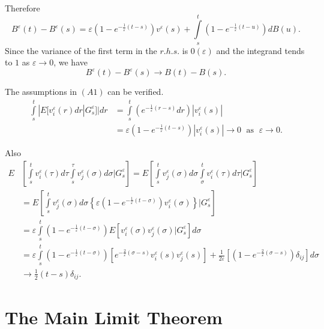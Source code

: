 Therefore\pageoriginale
$$
B^\varepsilon(t) - B^\varepsilon (s) = \varepsilon(1-e^{-
  \frac{1}{\varepsilon}(t-s)}) v^\varepsilon (s) +
\int\limits_{s}^t(1-e^{- \frac{1}{\varepsilon}(t-u)})dB(u).
$$
Since the variance of the first term in the $r.h.s$. is
$0(\varepsilon)$ and the integrand tends to $1$ as $\varepsilon \to
0$, we have  
$$
B^\varepsilon(t) - B^\varepsilon(s) \to B(t) -B(s).
$$

The assumptions in $(A1)$ can be verified.
\begin{align*}
  \int\limits_{s}^t|E[v^\varepsilon_i (r) dr |G^\varepsilon_s ]| dr &=
  \int\limits_{s}^t (e^{- \frac{1}{\varepsilon}(r-s)}dr)
  |v_i^\varepsilon (s) |\\ 
  &= \varepsilon (1-e^{- \frac{1}{\varepsilon}(t-s)}) |v_i^\varepsilon
  (s)| \to 0 \; \text{ as } \;  \varepsilon \to 0. 
\end{align*} 

Also
\begin{align*}
E & \left[\int\limits_{s}^t v^\varepsilon_i (\tau) d \tau
  \int\limits_{s}^\tau v^\varepsilon_j(\sigma)  d \sigma |
  G^\varepsilon_s \right] 
  =E \left[\int\limits_{s}^t v^\varepsilon_j (\sigma) d \sigma
  \int\limits_{\sigma}^t v^\varepsilon_i(\tau)  d \tau |
  G^\varepsilon_s \right]\\ 
  &=E \left[\int\limits_{s}^t v^\varepsilon_j (\sigma) d \sigma
    \left\{\varepsilon \left(1-e^{-\frac{1}{\varepsilon}(t -
      \sigma)}\right)  v_i^\varepsilon(\sigma) \right\}
    |G^\varepsilon_s \right]\\  
  &=\varepsilon \int\limits_{s}^t \left(1-e^{-\frac{1}{\varepsilon}(t
    - \sigma )}\right) 
  E\left[v^\varepsilon_i (\sigma)  v^\varepsilon_j (\sigma )|
    G^\varepsilon_s \right]d \sigma\\ 
  &= \varepsilon \int\limits_{s}^t \left(1-e^{-\frac{1}{\varepsilon}(t
    - \sigma )}\right) 
  \left[e^{- \frac{2}{\varepsilon}(\sigma-s )}v^\varepsilon_i (s)
    v_j^\varepsilon (s)\right] 
    + \frac{1}{2 \varepsilon} \left[\left(1-e^{-
        \frac{2}{\varepsilon}(\sigma-s)} \right)\delta_{ij} \right] d
    \sigma\\
    & \to \frac{1}{2}(t-s) \delta_{ij}.
\end{align*}



\section{The Main Limit Theorem}\label{chap3:sec3.3}%

